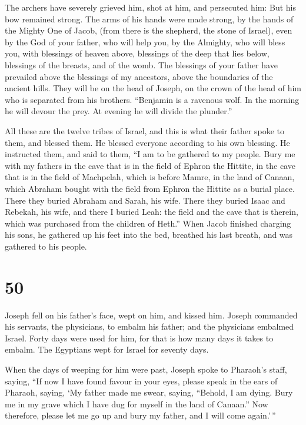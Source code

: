 The archers have severely grieved him, shot at him, and persecuted him:
 But his bow remained strong. The arms of his hands were
made strong, by the hands of the Mighty One of Jacob, (from there is the
shepherd, the stone of Israel),  even by the God of your
father, who will help you, by the Almighty, who will bless you, with
blessings of heaven above, blessings of the deep that lies below,
blessings of the breasts, and of the womb.  The blessings
of your father have prevailed above the blessings of my ancestors, above
the boundaries of the ancient hills. They will be on the head of Joseph,
on the crown of the head of him who is separated from his brothers.
 ``Benjamin is a ravenous wolf. In the morning he will
devour the prey. At evening he will divide the plunder.''

 All these are the twelve tribes of Israel, and this is
what their father spoke to them, and blessed them. He blessed everyone
according to his own blessing.  He instructed them, and
said to them, ``I am to be gathered to my people. Bury me with my
fathers in the cave that is in the field of Ephron the Hittite,
 in the cave that is in the field of Machpelah, which is
before Mamre, in the land of Canaan, which Abraham bought with the field
from Ephron the Hittite as a burial place.  There they
buried Abraham and Sarah, his wife. There they buried Isaac and Rebekah,
his wife, and there I buried Leah:  the field and the cave
that is therein, which was purchased from the children of Heth.''
 When Jacob finished charging his sons, he gathered up his
feet into the bed, breathed his last breath, and was gathered to his
people.

\hypertarget{section-49}{%
\section{50}\label{section-49}}

 Joseph fell on his father's face, wept on him, and kissed
him.  Joseph commanded his servants, the physicians, to
embalm his father; and the physicians embalmed Israel. 
Forty days were used for him, for that is how many days it takes to
embalm. The Egyptians wept for Israel for seventy days.

 When the days of weeping for him were past, Joseph spoke to
Pharaoh's staff, saying, ``If now I have found favour in your eyes,
please speak in the ears of Pharaoh, saying,  `My father
made me swear, saying, ``Behold, I am dying. Bury me in my grave which I
have dug for myself in the land of Canaan.'' Now therefore, please let
me go up and bury my father, and I will come again.'\,''


